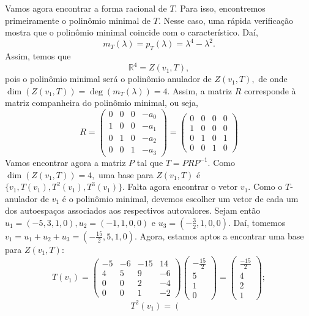 \documentclass[11pt,a4paper]{article}
\begin{document}
{Vamos agora encontrar a forma racional de $T.$ Para isso, encontremos primeiramente o polinômio minimal de $T.$ Nesse caso, uma rápida verificação mostra que o polinômio minimal coincide com o característico. Daí,
\[
m_T(\lambda) = p_T(\lambda) = \lambda^4 - \lambda^2.
\]
Assim, temos que
\[
\mathbb{R}^4 = Z(v_1, T),
\]
pois o polinômio minimal será o polinômio anulador de $Z(v_1,T),$ de onde $\dim(Z(v_1, T)) = \deg(m_T(\lambda)) = 4.$ Assim, a matriz $R$ corresponde à matriz companheira do polinômio minimal, ou seja,
\[R = \begin{pmatrix}
0 & 0 & 0 & -a_0 \\
1 & 0 & 0 & -a_1 \\
0 & 1 & 0 & -a_2 \\
0 & 0 & 1 &  -a_3
\end{pmatrix} = \begin{pmatrix}
0 & 0 & 0 & 0 \\
1 & 0 & 0 & 0 \\
0 & 1 & 0 & 1 \\
0 & 0 & 1 & 0
\end{pmatrix}
\]
Vamos encontrar agora a matriz $P$ tal que $T = PRP^{-1}.$ Como $\dim(Z(v_1, T)) = 4,$ uma base para $Z(v_1, T)$ é $\{ v_1, T(v_1), T^2(v_1), T^3(v_1) \}.$ Falta agora encontrar o vetor $v_1.$ Como o $T$-anulador de $v_1$ é o polinômio minimal, devemos escolher um vetor de cada um dos autoespaços associados aos respectivos autovalores. Sejam então $u_1 = (-5,3,1,0), u_2 = (-1,1,0,0)$ e $u_3 = \left( - \frac{3}{2}, 1, 0, 0 \right).$ Daí, tomemos $v_1 = u_1 + u_2 + u_3 = \left(-\frac{15}{2}, 5, 1, 0 \right).$  Agora, estamos aptos a encontrar uma base para $Z(v_1, T):$
\[
T(v_1) = \begin{pmatrix}
-5 & -6 & -15 & 14 \\
4 & 5 & 9 & -6 \\
0 & 0 & 2 & -4 \\
0 & 0 & 1 & -2
\end{pmatrix} \begin{pmatrix}
-\frac{15}{2} \\
5 \\
1 \\
0
\end{pmatrix} = \left(\begin{matrix}
\frac{-15}{2} \\
4 \\
2 \\
1
\end{matrix}\right);
\]
\[
T^2(v_1) = \left(\begin{matrix}

\end{matrix}\]}
\end{document}
